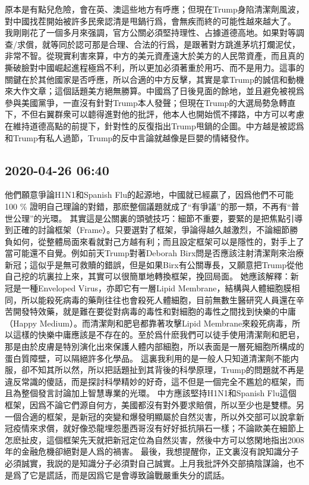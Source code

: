 \documentclass[twocolumn]{ctexart}
\begin{document}
原本是有點兒危險，會在英、澳這些地方有呼應；但現在Trump身陷清潔劑風波，對中國找茬開始被許多民衆認清是甩鍋行爲，會無疾而終的可能性越來越大了。
我剛剛花了一個多月來强調，官方公關必須堅持理性、占據道德高地。如果對等調查/求償，就等同於認可那是合理、合法的行爲，是跟著對方跳進茅坑打爛泥仗，非常不智。從現實利害來算，中方的美元資產遠大於美方的人民幣資產，而且真的撕破臉對中國崛起進程極爲不利，所以更加必須著重於用巧、而不是用力。這事的關鍵在於其他國家是否呼應，所以合適的中方反擊，其實是拿Trump的誠信和動機來大作文章；這個話題美方絕無勝算。中國爲了日後見面的餘地，並且避免被視爲參與美國黨爭，一直沒有針對Trump本人發聲；但現在Trump的大選局勢急轉直下，不但右翼群衆可以聼得進對他的批評，他本人也開始慌不擇路，中方可以考慮在維持道德高點的前提下，針對性的反復指出Trump甩鍋的企圖。中方越是被認爲和Trump有私人過節，Trump的反中言論就越像是巨嬰的情緒發作。
\subsection*{2020-04-26 06:40}

他們願意爭論H1N1和Spanish Flu的起源地，中國就已經贏了，因爲他們不可能100 \% 證明自己理論的對錯，那麽整個議題就成了“有爭議”的那一類，不再有“普世公理”的光環。 
其實這是公關裏的頭號技巧：細節不重要，要緊的是把焦點引導到正確的討論框架（Frame）。只要選對了框架，爭論得越久越激烈，不論細節勝負如何，從整體局面來看就對己方越有利；而且設定框架可以是隱性的，對手上了當可能還不自覺。例如前天Trump對著Deborah Birx問是否應該注射清潔劑來治療新冠；這似乎是無可救贖的錯誤，但是如果Birx有公關專長，又願意把Trump從他自己挖的坑裏拉上來，其實可以很簡單地轉換框架，挽回局面。 
她應該解釋：新冠是一種Enveloped Virus，亦即它有一層Lipid Membrane，結構與人體細胞膜相同，所以能殺死病毒的藥劑往往也會殺死人體細胞，目前無數生醫研究人員還在辛苦開發特效藥，就是難在要從對病毒的毒性和對細胞的毒性之間找到快樂的中庸（Happy Medium）。而清潔劑和肥皂都靠著攻擊Lipid Membrane來殺死病毒，所以這樣的快樂中庸應該是不存在的。至於爲什麽我們可以徒手使用清潔劑和肥皂，那是由於皮膚是特別演化出來保護人體内部細胞，所以表面是一層死細胞所構成的蛋白質障壁，可以隔絕許多化學品。 
這裏我利用的是一般人只知道清潔劑不能内服，卻不知其所以然，所以把話題扯到其背後的科學原理，Trump的問題就不再是違反常識的傻話，而是探討科學精妙的好奇，這不但是一個完全不尷尬的框架，而且為整個發言討論加上智慧專業的光環。 
中方應該堅持H1N1和Spanish Flu這個框架，因爲不論它們源自何方，美國都沒有對外要求賠償，所以至少也是雙標。另一個合適的框架，是新冠的突變和爆發明顯屬於自然災害，所以外交部可以說拿新冠疫情來求償，就好像恐龍埋怨墨西哥沒有好好抵抗隕石一樣；不論歐美在細節上怎麽扯皮，這個框架先天就把新冠定位為自然災害，然後中方可以悠閑地指出2008年的金融危機卻絕對是人爲的禍害。 
最後，我想提醒你，正文裏沒有說知識分子必須誠實，我説的是知識分子必須對自己誠實。上月我批評外交部搞陰謀論，也不是爲了它是謊話，而是因爲它是會導致論戰嚴重失分的謊話。
\end{document}
